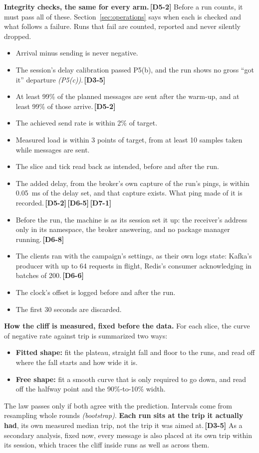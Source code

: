 \documentclass[11pt]{article}
\newcommand{\gl}[1]{{\color{soft}\itshape\small (#1)}}
\newcommand{\chgold}[1]{\,{\color{oldcol}\bfseries\footnotesize[#1]}}
\begin{document}
\textbf{Integrity checks, the same for every arm.}\chgold{D5-2} Before a run counts, it must pass all of these. Section~\ref{sec:operations} says when each is checked and what follows a failure. Runs that fail are counted, reported and never silently dropped.
\begin{itemize}
  \item Arrival minus sending is never negative.
  \item The session's delay calibration passed P5(b), and the run shows no gross ``got it'' departure \gl{P5(c)}.\chgold{D3-5}
  \item At least 99\% of the planned messages are sent after the warm-up, and at least 99\% of those arrive.\chgold{D5-2}
  \item The achieved send rate is within 2\% of target.
  \item Measured load is within 3 points of target, from at least 10 samples taken while messages are sent.
  \item The slice and tick read back as intended, before and after the run.
  \item The added delay, from the broker's own capture of the run's pings, is within 0.05~ms of the delay set, and that capture exists. What ping made of it is recorded.\chgold{D5-2}\chgold{D6-5}\chgold{D7-1}
  \item Before the run, the machine is as its session set it up: the receiver's address only in its namespace, the broker answering, and no package manager running.\chgold{D6-8}
  \item The clients ran with the campaign's settings, as their own logs state: Kafka's producer with up to 64 requests in flight, Redis's consumer acknowledging in batches of 200.\chgold{D6-6}
  \item The clock's offset is logged before and after the run.
  \item The first 30 seconds are discarded.
\end{itemize}

\textbf{How the cliff is measured, fixed before the data.} For each slice, the curve of negative rate against trip is summarized two ways:
\begin{itemize}
  \item \textbf{Fitted shape:} fit the plateau, straight fall and floor to the runs, and read off where the fall starts and how wide it is.
  \item \textbf{Free shape:} fit a smooth curve that is only required to go down, and read off the halfway point and the 90\%-to-10\% width.
\end{itemize}
The law passes only if both agree with the prediction. Intervals come from resampling whole rounds \gl{bootstrap}. \textbf{Each run sits at the trip it actually had}, its own measured median trip, not the trip it was aimed at.\chgold{D3-5} As a secondary analysis, fixed now, every message is also placed at its own trip within its session, which traces the cliff inside runs as well as across them.
\end{document}
